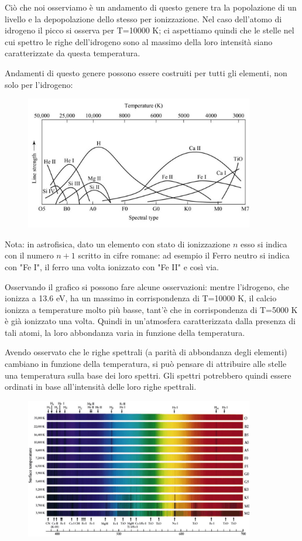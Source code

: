 Ciò che noi osserviamo è un andamento di questo genere tra la popolazione di un livello e la depopolazione dello stesso per ionizzazione. Nel caso dell'atomo di idrogeno il picco si osserva per T=10000 K; ci aspettiamo quindi che le stelle nel cui spettro le righe dell'idrogeno sono al massimo della loro intensità siano caratterizzate da questa temperatura.

Andamenti di questo genere possono essere costruiti per tutti gli elementi, non solo per l'idrogeno:

\begin{figure}[H]
\centering
\includegraphics[width=10cm]{173507.jpg}
\end{figure}

Nota: in astrofisica, dato un elemento con stato di ionizzazione $n$ esso si indica con il numero $n+1$ scritto in cifre romane: ad esempio il Ferro neutro si indica con "Fe I", il ferro una volta ionizzato con "Fe II" e così via.

Osservando il grafico si possono fare alcune osservazioni: mentre l'idrogeno, che ionizza a 13.6 eV, ha un massimo in corrispondenza di T=10000 K, il calcio ionizza a temperature molto più basse, tant'è che in corrispondenza di T=5000 K è già ionizzato una volta. Quindi in un'atmosfera caratterizzata dalla presenza di tali atomi, la loro abbondanza varia in funzione della temperatura.

Avendo osservato che le righe spettrali (a parità di abbondanza degli elementi) cambiano in funzione della temperatura, si può pensare di attribuire alle stelle una temperatura sulla base dei loro spettri. Gli spettri potrebbero quindi essere ordinati in base all'intensità delle loro righe spettrali.

\begin{figure}[H]
  \centering
  \includegraphics[width=10cm]{174642.jpg}
\end{figure}

